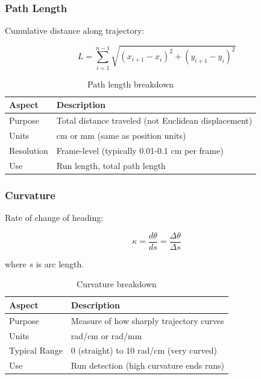 \documentclass[
  11pt,
]{article}
\begin{document}
\hypertarget{path-length}{%
\subsubsection{Path Length}\label{path-length}}

Cumulative distance along trajectory:

\[L = \sum_{i=1}^{n-1} \sqrt{(x_{i+1} - x_i)^2 + (y_{i+1} - y_i)^2}\]

\begin{table}[H]
\centering
\small
\begin{tabular}{p{3cm}p{11cm}}
\hline
\textbf{Aspect} & \textbf{Description} \\
\hline
Purpose & Total distance traveled (not Euclidean displacement) \\
Units & cm or mm (same as position units) \\
Resolution & Frame-level (typically 0.01-0.1 cm per frame) \\
Use & Run length, total path length \\
\hline
\end{tabular}
\caption{Path length breakdown}

\end{table}

\hypertarget{curvature}{%
\subsubsection{Curvature}\label{curvature}}

Rate of change of heading:

\[\kappa = \frac{d\theta}{ds} = \frac{\Delta\theta}{\Delta s}\]

where \(s\) is arc length.

\begin{table}[H]
\centering
\small
\begin{tabular}{p{3cm}p{11cm}}
\hline
\textbf{Aspect} & \textbf{Description} \\
\hline
Purpose & Measure of how sharply trajectory curves \\
Units & rad/cm or rad/mm \\
Typical Range & 0 (straight) to 10 rad/cm (very curved) \\
Use & Run detection (high curvature ends runs) \\
\hline
\end{tabular}
\caption{Curvature breakdown}

\end{table}
\end{document}
